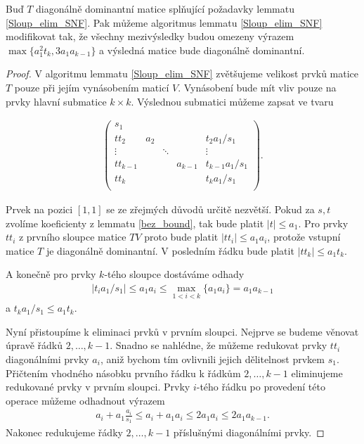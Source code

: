 \begin{lem}\label{Sloup_elim_SNF_modified}
Buď $ T $ diagonálně dominantní matice splňující požadavky lemmatu \ref{Sloup_elim_SNF}.
Pak můžeme algoritmus lemmatu \ref{Sloup_elim_SNF} modifikovat tak, že všechny
mezivýsledky budou omezeny výrazem 
$ \max\{ a_1^2 t_k, 3 a_1 a_{k - 1} \}  $ 
a výsledná matice bude diagonálně dominantní.
\end{lem}
\begin{proof}
V algoritmu lemmatu \ref{Sloup_elim_SNF} zvětšujeme velikost prvků matice $ T $
pouze při jejím vynásobením maticí $ V $. Vynásobení bude mít vliv pouze na
prvky hlavní submatice $ k \times k $. Výslednou submatici můžeme zapsat ve tvaru

\begin{align*}
    \left(
    \begin{array}{ccccc}
        s_1        &     &        &         &                 \\
        tt_2       & a_2 &        &         & t_2 a_1/s_1     \\
        \vdots     &     & \ddots &         & \vdots          \\
        tt_{k - 1} &     &        & a_{k-1} & t_{k-1} a_1/s_1 \\
        tt_k       &     &        &         & t_k a_1/s_1     \\
    \end{array}
    \right)
.
\end{align*}

Prvek na pozici $ [1,1] $ se ze zřejmých důvodů určitě nezvětší. Pokud za $ s, t $
zvolíme koeficienty z lemmatu \ref{bez_bound}, tak bude platit $ |t| \leq a_1 $.
Pro prvky $ t t_i $ z prvního sloupce matice $ TV $ proto bude platit
$ |t t_i| \leq a_1 a_i $, protože vstupní matice $ T $ je diagonálně dominantní.
V posledním řádku bude platit $ |t t_k| \leq a_1 t_k $.

A konečně pro prvky $ k $-tého sloupce dostáváme odhady
\begin{align*}
|t_i a_1 / s_1| \leq a_1 a_i \leq \max\limits_{1 < i < k }\{ a_1 a_{i} \} = a_1 a_{k - 1}
\end{align*}
a $ t_k a_1 / s_1 \leq a_1 t_k $.

Nyní přistoupíme k eliminaci prvků v prvním sloupci. Nejprve se budeme věnovat
úpravě řádků $ 2, \dots, k - 1 $. Snadno se nahlédne, že můžeme redukovat prvky
$ t t_i $ diagonálními prvky $ a_i $, aniž bychom tím ovlivnili jejich dělitelnost
prvkem $ s_1 $. Přičtením vhodného násobku prvního řádku k řádkům 
$ 2, \dots, k - 1 $ eliminujeme redukované prvky v prvním sloupci. 
Prvky $ i $-tého řádku po provedení této operace můžeme odhadnout
výrazem 
\begin{align*}
    a_i + a_1 \frac{a_i}{s_1} 
    \leq a_i + a_1 a_i 
    \leq 2 a_1 a_i
    \leq 2 a_1 a_{k - 1}.
\end{align*}
Nakonec redukujeme řádky $ 2, \dots, k - 1 $ příslušnými diagonálními prvky.


\end{proof}
